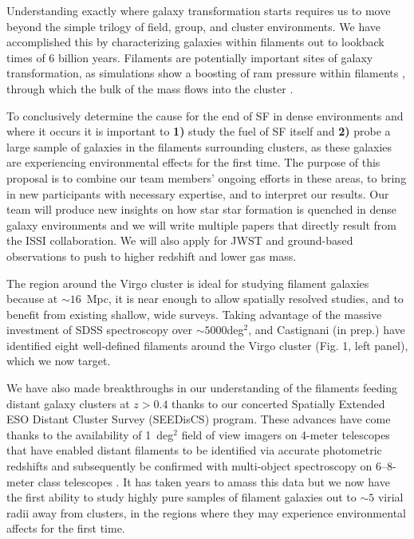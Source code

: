 \documentclass[11pt]{article}
\begin{document}
Understanding exactly where galaxy transformation starts requires us to move beyond the simple trilogy of field, group, and cluster environments.  We have accomplished this by characterizing galaxies within filaments out to lookback times of 6 billion years.  Filaments are potentially important sites of galaxy transformation, as simulations show a boosting of ram pressure within filaments \citep{Bahe13}, through which the bulk of the mass flows into the cluster \citep{Ramachandra15}. 

To conclusively determine the cause for the end of SF in dense environments and where it occurs it is important to \textbf{1)} study the fuel of SF itself and {\bf 2)} probe a large sample of galaxies in the filaments surrounding clusters, as these galaxies are experiencing environmental effects for the first time.  The purpose of this proposal is to combine our team members' ongoing efforts in these areas, to bring in new participants with necessary expertise, and to interpret our results.  Our team will produce new insights on how star star formation is quenched in dense galaxy environments and we will write multiple papers that directly result from the ISSI collaboration.  We will also apply for JWST and ground-based observations to push to higher redshift and lower gas mass.

  The region around the Virgo cluster is ideal for studying filament galaxies because at $\sim 16$~Mpc,  it is near enough to allow spatially resolved studies, and to benefit from existing shallow, wide surveys. Taking advantage of the massive investment of SDSS spectroscopy over $\sim 5000$deg$^2$, \citet{Kim16} and Castignani (in prep.) have identified eight well-defined filaments around the Virgo cluster (Fig. 1, left panel), which we now target.

We have also made breakthroughs in our understanding of the filaments feeding distant galaxy clusters at $z>0.4$ thanks to our concerted Spatially Extended ESO Distant Cluster Survey (SEEDisCS) program.  These advances have come thanks to the availability of 1~deg$^{2}$ field of view imagers on 4-meter telescopes that have enabled distant filaments to be identified via accurate photometric redshifts and subsequently be confirmed with multi-object spectroscopy on 6--8-meter class telescopes \citep[Fig. 1, right panel;][]{Rerat17}.  It has taken years to amass this data but we now have the first ability to study highly pure samples of filament galaxies out to $\sim 5$ virial radii away from clusters, in the regions where they may experience environmental affects for the first time.
\end{document}
